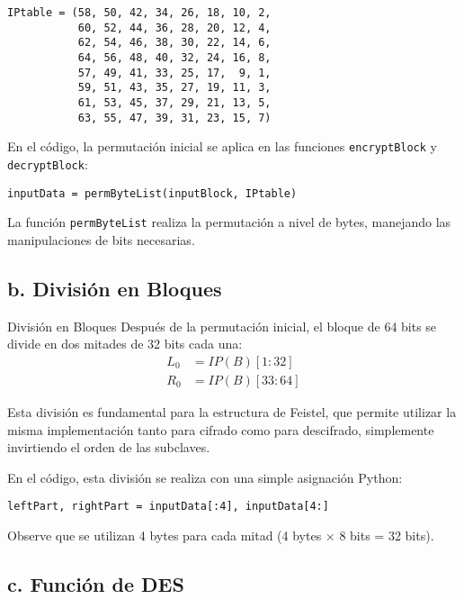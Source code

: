 \begin{lstlisting}[style=cryptoalgo, caption={Tabla de Permutación Inicial}, label=lst:ip]
IPtable = (58, 50, 42, 34, 26, 18, 10, 2,
           60, 52, 44, 36, 28, 20, 12, 4,
           62, 54, 46, 38, 30, 22, 14, 6,
           64, 56, 48, 40, 32, 24, 16, 8,
           57, 49, 41, 33, 25, 17,  9, 1,
           59, 51, 43, 35, 27, 19, 11, 3,
           61, 53, 45, 37, 29, 21, 13, 5,
           63, 55, 47, 39, 31, 23, 15, 7)
\end{lstlisting}

En el código, la permutación inicial se aplica en las funciones \texttt{encryptBlock} y \texttt{decryptBlock}:

\begin{lstlisting}[style=cryptoalgo]
inputData = permByteList(inputBlock, IPtable)
\end{lstlisting}

La función \texttt{permByteList} realiza la permutación a nivel de bytes, manejando las manipulaciones de bits necesarias.

\subsection{b. División en Bloques}

\begin{cryptomethod}{División en Bloques}
	Después de la permutación inicial, el bloque de 64 bits se divide en dos mitades de 32 bits cada una:
	\begin{align}
		L_0 & = IP(B)[1:32]  \\
		R_0 & = IP(B)[33:64]
	\end{align}

	Esta división es fundamental para la estructura de Feistel, que permite utilizar la misma implementación tanto para cifrado como para descifrado, simplemente invirtiendo el orden de las subclaves.
\end{cryptomethod}

En el código, esta división se realiza con una simple asignación Python:

\begin{lstlisting}[style=cryptoalgo]
leftPart, rightPart = inputData[:4], inputData[4:]
\end{lstlisting}

Observe que se utilizan 4 bytes para cada mitad (4 bytes × 8 bits = 32 bits).

\subsection{c. Función de DES}

